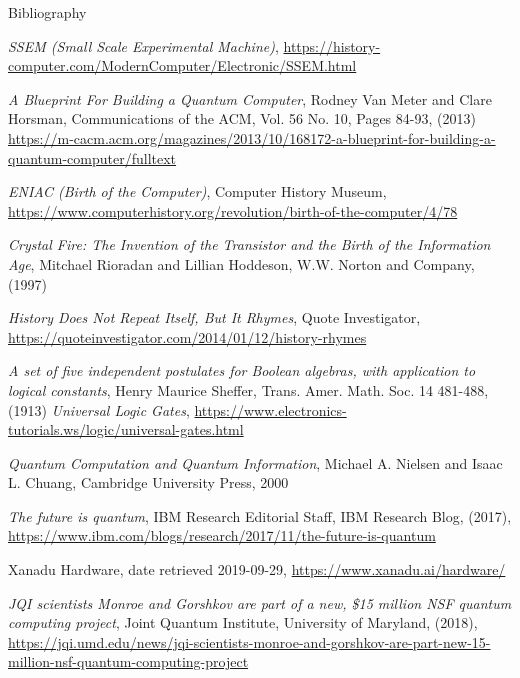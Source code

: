 \documentclass[handout]{beamer}
\begin{document}
\begin{frame}[allowframebreaks]{Bibliography}
  \begin{thebibliography}{99}
    \emph{SSEM (Small Scale Experimental Machine)}, %
    \url{https://history-computer.com/ModernComputer/Electronic/SSEM.html}

    \emph{A Blueprint For Building a Quantum Computer}, %
    Rodney Van Meter and Clare Horsman, %
    Communications of the ACM, Vol. 56 No. 10, Pages 84-93, (2013) %
    \url{https://m-cacm.acm.org/magazines/2013/10/168172-a-blueprint-for-building-a-quantum-computer/fulltext}

    \emph{ENIAC (Birth of the Computer)}, %
    Computer History Museum, %
    \url{https://www.computerhistory.org/revolution/birth-of-the-computer/4/78}

    \emph{Crystal Fire: The Invention of the Transistor and the Birth of the Information Age}, %
    Mitchael Rioradan and Lillian Hoddeson, %
    W.W. Norton and Company, (1997)
    
    \emph{History Does Not Repeat Itself, But It Rhymes}, %
    Quote Investigator, %
    \url{https://quoteinvestigator.com/2014/01/12/history-rhymes}

    
    \emph{A set of five independent postulates for Boolean algebras, with application to logical constants}, %
    Henry Maurice Sheffer, %
    Trans. Amer. Math. Soc. 14 481-488, (1913)
    \emph{Universal Logic Gates}, %
    \url{https://www.electronics-tutorials.ws/logic/universal-gates.html}
    
    \emph{Quantum Computation and Quantum Information},
    Michael A. Nielsen and Isaac L. Chuang, %
    Cambridge University Press, %
    2000

    \emph{The future is quantum}, %
    IBM Research Editorial Staff, %
    IBM Research Blog, (2017), %
    \url{https://www.ibm.com/blogs/research/2017/11/the-future-is-quantum}

    Xanadu Hardware, %
    date retrieved 2019-09-29, 
    \url{https://www.xanadu.ai/hardware/}

    \emph{JQI scientists Monroe and Gorshkov are part of a new, \$15 million
      NSF quantum computing project}, %
    Joint Quantum Institute, University of Maryland, (2018), %
    \url{https://jqi.umd.edu/news/jqi-scientists-monroe-and-gorshkov-are-part-new-15-million-nsf-quantum-computing-project}


\end{thebibliography}
\end{frame}
\end{document}

